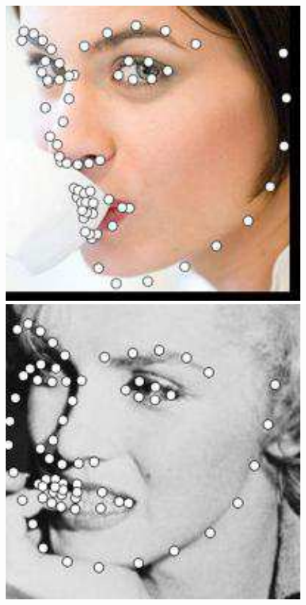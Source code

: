 \documentclass[journal]{IEEEtran}
\begin{document}
\begin{figure}[!htb]
\includegraphics[scale=0.22]{68_CFSS_image_097_1}
\includegraphics[scale=0.22]{68_CFSS_image_017_1}


\end{figure}
\end{document}
